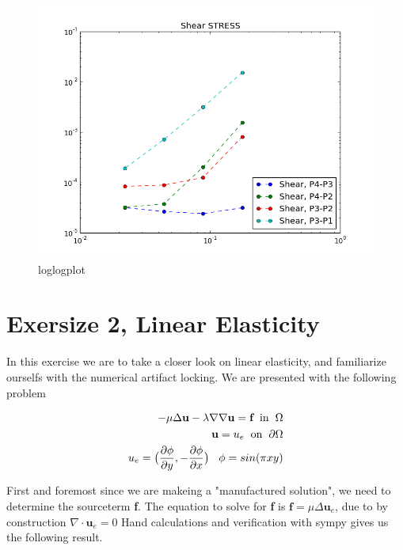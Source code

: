 \documentclass[a4paper,norsk]{article}
\begin{document}
\begin{figure}[h!]
	\centering
	\caption*{loglogplot}
	\includegraphics[scale=0.4]{shear.png}
\end{figure}

\section*{Exersize 2, Linear Elasticity}
In this exercise we are to take a closer look on linear elasticity, and familiarize ourselfs with
the numerical artifact locking. We are presented with the following problem

\begin{align*}
-\mu \Delta \textbf{u} - \lambda \nabla \nabla \textbf{u} = \textbf{f} \hspace{2mm} \text{in} \hspace{2mm} \Omega \\
\textbf{u} = u_e \hspace{2mm} \text{on} \hspace{2mm} \partial \Omega \\
u_e = \big(\frac{\partial \phi}{\partial y}, -\frac{\partial \phi}{\partial x} \big) \hspace{3mm}
\phi = sin(\pi x y)
\end{align*}

First and foremost since we are makeing a "manufactured solution", we need to determine the sourceterm \textbf{f}. The equation
to solve for \textbf{f} is $\textbf{f} =\mu  \Delta \textbf{u}_e$, due to by construction $\nabla \cdot \textbf{u}_e = 0$
 Hand calculations and verification with sympy gives us the following result.
\end{document}
